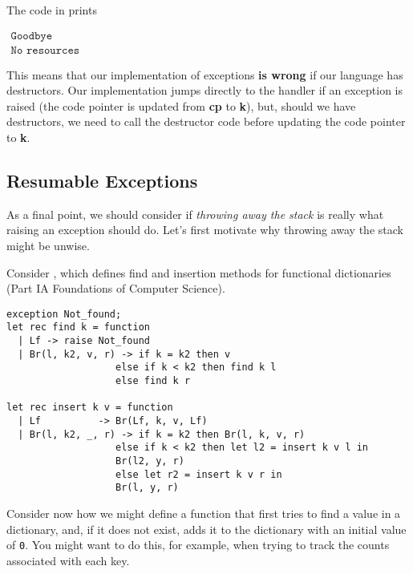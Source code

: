 The code in  prints

$\begin{array}{l}
     \texttt{Goodbye}  \\
     \texttt{No resources}& 
\end{array}$

This means that our implementation of exceptions \textbf{is wrong} if our language has destructors. Our implementation jumps directly to the handler if an exception is raised (the code pointer is updated from \textbf{cp} to \textbf{k}), but, should we have destructors, we need to call the destructor code before updating the code pointer to \textbf{k}.

\subsection{Resumable Exceptions}
As a final point, we should consider if \textit{throwing away the stack} is really what raising an exception should do. Let's first motivate why throwing away the stack might be unwise. 

Consider , which defines find and insertion methods for functional dictionaries (\textsf{Part IA Foundations of Computer Science}). 

\begin{code}
\label{code:ocaml-tree-suite}
\begin{verbatim}
exception Not_found;
let rec find k = function
  | Lf -> raise Not_found
  | Br(l, k2, v, r) -> if k = k2 then v
                   else if k < k2 then find k l
                   else find k r
                   
let rec insert k v = function
  | Lf          -> Br(Lf, k, v, Lf)
  | Br(l, k2, _, r) -> if k = k2 then Br(l, k, v, r)
                   else if k < k2 then let l2 = insert k v l in
                   Br(l2, y, r)
                   else let r2 = insert k v r in
                   Br(l, y, r)
\end{verbatim}
\end{code}

Consider now how we might define a function that first tries to find a value in a dictionary, and, if it does not exist, adds it to the dictionary with an initial value of \texttt{0}. You might want to do this, for example, when trying to track the counts associated with each key.

